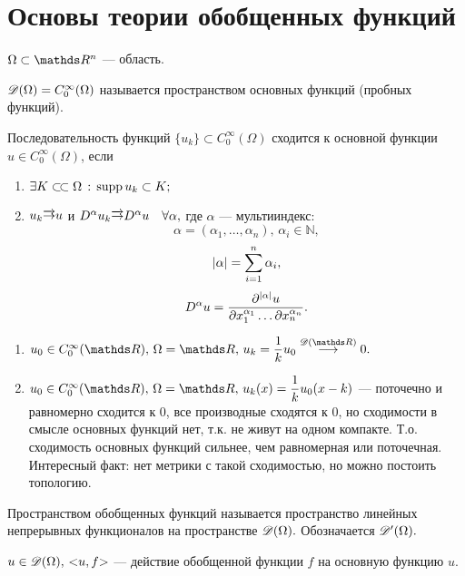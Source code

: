 \section{Основы теории обобщенных функций}
$\Omega \subset \real^n$ --- область.

\begin{definition}
$ \mathscr{D}(\Omega) = C_0^\infty(\Omega)$ называется пространством основных функций (пробных функций).
\end{definition}

\begin{definition}
Последовательность функций $\{u_k\} \subset C_0^\infty(\Omega)$ сходится к основной функции $u \in C_0^\infty(\Omega)$, если 
\begin{enumerate}
\item $\exists K \ssubset \Omega \, : \, \supp u_k \subset K;$
\item $u_k \overrightarrow{\rightarrow} u$ и $D^\alpha u_k \overrightarrow{\rightarrow} D^\alpha u \quad \forall \alpha,$ где $\alpha$ --- мультииндекс: $$\alpha = (\alpha_1, \ldots, \alpha_n), \, \alpha_i \in \mathds{N},$$ $$\lvert\alpha\rvert = \sum\limits_{i=1}^{n}\alpha_i,$$
$$D^\alpha u = \dfrac{\partial^{\lvert\alpha\rvert}u}{\partial x_1^{\alpha_1}\ldots\partial x_n^{\alpha_n}}.$$
\end{enumerate}
\end{definition}

\begin{examples}
\begin{enumerate}
\item $u_0 \in C_0^\infty(\real), \, \Omega = \real, \, u_k = \dfrac{1}{k}u_0 \stackrel{\beauD(\real)}\longrightarrow 0.$
\item $u_0 \in C_0^\infty(\real), \, \Omega = \real, \, u_k(x) = \dfrac{1}{k}u_0(x - k)$ --- поточечно и равномерно сходится к 0, все производные сходятся к 0, но сходимости в смысле основных функций нет, т.к. не живут на одном компакте. Т.о. сходимость основных функций сильнее, чем равномерная или поточечная. Интересный факт: нет метрики с такой сходимостью, но можно постоить топологию.
\end{enumerate}
\end{examples}

\begin{definition}
Пространством обобщенных функций называется пространство линейных непрерывных функционалов на пространстве $\mathscr{D}(\Omega).$ Обозначается $\mathscr{D}'(\Omega).$
\begin{note}
$u \in \beauD(\Omega), \, \action{u,f}$ --- действие обобщенной функции $f$ на основную функцию $u$.
\end{note}
\end{definition}

